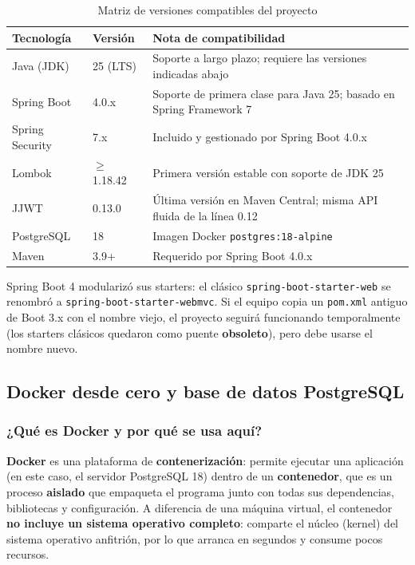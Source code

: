 \documentclass[11pt,a4paper]{article}
\begin{document}
\begin{table}[h!]
\centering
\caption{Matriz de versiones compatibles del proyecto}
\small
\begin{tabular}{l l p{7.6cm}}
\toprule
\textbf{Tecnología} & \textbf{Versión} & \textbf{Nota de compatibilidad} \\
\midrule
Java (JDK) & 25 (LTS) & Soporte a largo plazo; requiere las versiones indicadas abajo \\
Spring Boot & 4.0.x & Soporte de primera clase para Java 25; basado en Spring Framework 7 \\
Spring Security & 7.x & Incluido y gestionado por Spring Boot 4.0.x \\
Lombok & $\geq$ 1.18.42 & Primera versión estable con soporte de JDK 25 \\
JJWT & 0.13.0 & Última versión en Maven Central; misma API fluida de la línea 0.12 \\
PostgreSQL & 18 & Imagen Docker \texttt{postgres:18-alpine} \\
Maven & 3.9+ & Requerido por Spring Boot 4.0.x \\
\bottomrule
\end{tabular}
\end{table}

\begin{cajaalerta}
Spring Boot 4 modularizó sus starters: el clásico \texttt{spring-boot-starter-web} se renombró a \texttt{spring-boot-starter-webmvc}. Si el equipo copia un \texttt{pom.xml} antiguo de Boot 3.x con el nombre viejo, el proyecto seguirá funcionando temporalmente (los starters clásicos quedaron como puente \textbf{obsoleto}), pero debe usarse el nombre nuevo.
\end{cajaalerta}

\subsection{Docker desde cero y base de datos PostgreSQL}

\subsubsection{¿Qué es Docker y por qué se usa aquí?}

\textbf{Docker} es una plataforma de \textbf{contenerización}: permite ejecutar una aplicación (en este caso, el servidor PostgreSQL 18) dentro de un \textbf{contenedor}, que es un proceso \textbf{aislado} que empaqueta el programa junto con todas sus dependencias, bibliotecas y configuración. A diferencia de una máquina virtual, el contenedor \textbf{no incluye un sistema operativo completo}: comparte el núcleo (kernel) del sistema operativo anfitrión, por lo que arranca en segundos y consume pocos recursos.
\end{document}
